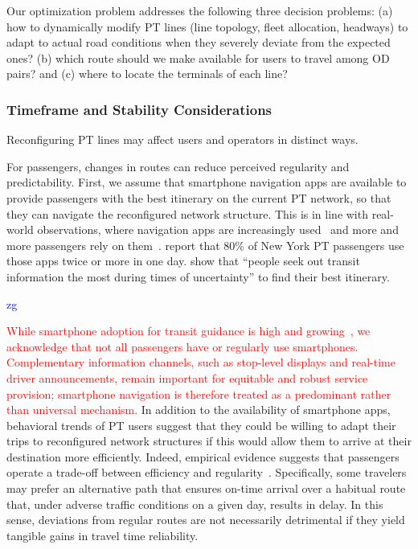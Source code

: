 \documentclass[a4paper,fleqn]{cas-sc}
\newcommand{\stkout}[1]{\ifmmode\text{\sout{\ensuremath{#1}}}\else\sout{#1}\fi}
\newcommand\rev[3]{\textcolor{blue}{\begin{scriptsize}{#1}\end{scriptsize}\stkout{#2}}\textcolor{red}{#3}}
\newcommand\rev[3]{\ignorespaces#3\ignorespaces\unskip}
\begin{document}
Our optimization problem addresses the following three decision problems:
(a) how to dynamically modify PT lines (line topology, fleet allocation, headways) to adapt to actual road conditions when they severely deviate from the expected ones?
(b) which route should we make available for users to travel among OD pairs? and
(c) where to locate the terminals of each line?


\subsubsection{Timeframe and Stability Considerations}\label{sec:timeframe}
Reconfiguring PT lines may affect users and operators in distinct ways. 

For passengers, changes in routes can reduce perceived regularity and predictability. First, we assume that smartphone navigation apps are available to provide passengers with the best itinerary on the current PT network, so that they can navigate the reconfigured network structure. This is in line with real-world observations, where navigation apps are increasingly used~\citep {SmartphoneUse2016} and more and more passengers rely on them~\citep{durand2024digital}. \citet[p 147]{ghahramani2016trends} report that 80\% of New York PT passengers use those apps twice or more in one day. \citet{Shalaby2024} show that ``people seek out transit information the most during times of uncertainty'' to find their best itinerary.
%
\rev{zg}{}{While smartphone adoption for transit guidance is high and growing~\citep{SmartphoneUse2016, durand2024digital}, we acknowledge that not all passengers have or regularly use smartphones. Complementary information channels, such as stop-level displays and real-time driver announcements, remain important for equitable and robust service provision; smartphone navigation is therefore treated as a predominant rather than universal mechanism.}
In addition to the availability of smartphone apps, behavioral trends of PT users suggest that they could be willing to adapt their trips to reconfigured network structures if this would allow them to arrive at their destination more efficiently.
Indeed, empirical evidence suggests that passengers operate a trade-off between efficiency and regularity~\citep{devarasetty2012value}. Specifically, some travelers may prefer an alternative path that ensures on-time arrival over a habitual route that, under adverse traffic conditions on a given day, results in delay. In this sense, deviations from regular routes are not necessarily detrimental if they yield tangible gains in travel time reliability. 
\end{document}
